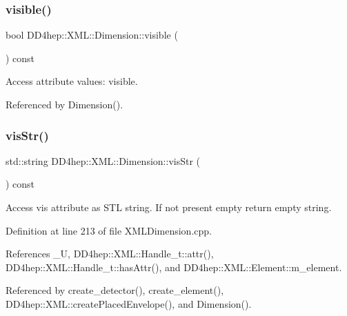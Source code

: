 \subsubsection{\texorpdfstring{visible()}{visible()}}
{\footnotesize\ttfamily bool D\+D4hep\+::\+X\+M\+L\+::\+Dimension\+::visible (\begin{DoxyParamCaption}{ }\end{DoxyParamCaption}) const}



Access attribute values\+: visible. 



Referenced by Dimension().

\hypertarget{struct_d_d4hep_1_1_x_m_l_1_1_dimension_aa84739ec3824bf2adf8e22c11a28d01c}{}\label{struct_d_d4hep_1_1_x_m_l_1_1_dimension_aa84739ec3824bf2adf8e22c11a28d01c} 
\subsubsection{\texorpdfstring{vis\+Str()}{visStr()}}
{\footnotesize\ttfamily std\+::string D\+D4hep\+::\+X\+M\+L\+::\+Dimension\+::vis\+Str (\begin{DoxyParamCaption}{ }\end{DoxyParamCaption}) const}



Access vis attribute as S\+TL string. If not present empty return empty string. 



Definition at line 213 of file X\+M\+L\+Dimension.\+cpp.



References \+\_\+U, D\+D4hep\+::\+X\+M\+L\+::\+Handle\+\_\+t\+::attr(), D\+D4hep\+::\+X\+M\+L\+::\+Handle\+\_\+t\+::has\+Attr(), and D\+D4hep\+::\+X\+M\+L\+::\+Element\+::m\+\_\+element.



Referenced by create\+\_\+detector(), create\+\_\+element(), D\+D4hep\+::\+X\+M\+L\+::create\+Placed\+Envelope(), and Dimension().

\hypertarget{struct_d_d4hep_1_1_x_m_l_1_1_dimension_ac897112473a04bb5dba07aa0e1c58e40}{}\label{struct_d_d4hep_1_1_x_m_l_1_1_dimension_ac897112473a04bb5dba07aa0e1c58e40} 
